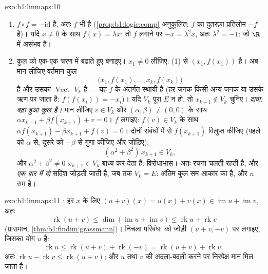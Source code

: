 \begin{solution}{exo:b1:linmaps:10}
\begin{enumerate}
  \item $f \circ f = -\mathrm{id}$  है, अतः $f$ भी है
  (\cref{prop:b1:logic:comp} अनुकूलित: $f$ का दुतरफ़ा प्रतिलोम $-f$ है)। यदि
  $x \neq 0$ के साथ $f(x) = \lambda x$: तो $f$ लगाने पर $-x = \lambda^2 x$,
  अतः $\lambda^2 = -1$: जो $\R$ में असंभव है।
  \item कुल को एक-एक चरण में बढ़ाते हुए बनाइए। $x_1 \neq 0$ लीजिए: (1) से
  $(x_1, f(x_1))$  है। अब मान लीजिए वर्तमान कुल
        \[
        \bigl(x_1, f(x_1), \dots, x_k, f(x_k)\bigr)
        \]
  है और उसका $\operatorname{Vect}$ $V_k$ है --- यह $f$ के अंतर्गत स्थायी
   है (हर जनक किसी अन्य जनक या उसके ऋण पर जाता है: $f(f(x_i)) =
  -x_i$)। यदि $V_k$ पूरा $E$ न हो, तो $x_{k+1} \notin V_k$ चुनिए।
  \emph{दावा: बढ़ा हुआ कुल  है।} मान लीजिए $v \in V_k$ और $(\alpha, \beta) \neq
  (0,0)$ के साथ $\alpha x_{k+1} + \beta f(x_{k+1}) + v = 0$। $f$ लगाइए:
  $f(v) \in V_k$ के साथ $\alpha f(x_{k+1}) - \beta x_{k+1} + f(v) = 0$।
  दोनों संबंधों में से $f(x_{k+1})$ विलुप्त कीजिए (पहले को $\alpha$ से,
  दूसरे को $-\beta$ से गुणा कीजिए और जोड़िए):
        \[
        (\alpha^2 + \beta^2)\, x_{k+1} \in V_k ,
        \]
        और $\alpha^2 + \beta^2 \neq 0$ $x_{k+1} \in V_k$ बाध्य कर देता है:
        विरोधाभास। अतः रचना चलती रहती है, और \emph{एक बार में दो} सदिश
        जोड़ती जाती है, जब तक $V_k = E$: अंतिम कुल सम आकार का  है, और
        $n$ सम है।
\end{enumerate}
\end{solution}

\begin{solution}{exo:b1:linmaps:11}
: हर $x$ के लिए $(u + v)(x) = u(x) + v(x) \in \operatorname{im} u
+ \operatorname{im} v$, अतः
\[
\operatorname{rk}(u + v)
\leq \dim(\operatorname{im} u + \operatorname{im} v)
\leq \operatorname{rk} u + \operatorname{rk} v
\]
(ग्रासमान, \cref{thm:b1:findim:grassmann})। निचला परिबंध:  को
जोड़ी $(u + v, -v)$ पर लगाइए, जिसका योग $u$ है:
\[
\operatorname{rk} u \leq \operatorname{rk}(u + v) +
\operatorname{rk}(-v) = \operatorname{rk}(u + v) +
\operatorname{rk} v,
\]
अतः $\operatorname{rk} u - \operatorname{rk} v \leq \operatorname{rk}(u+v)$;
और $u$ तथा $v$ की अदला-बदली करने पर निरपेक्ष मान मिल जाता है।
\end{solution}


